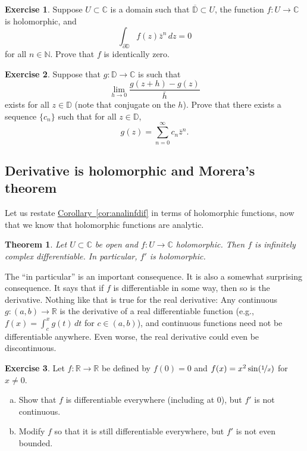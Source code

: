 \documentclass[12pt,openany]{book}
\newcommand{\C}{{\mathbb{C}}}
\newcommand{\R}{{\mathbb{R}}}
\newcommand{\N}{{\mathbb{N}}}
\newcommand{\D}{{\mathbb{D}}}
\newcommand{\myquote}[1]{``#1''}
\theoremstyle{plain}
\newtheorem{thm}{Theorem}[section]
\theoremstyle{remark}
\theoremstyle{definition}
\newenvironment{exbox}{%
    \def\FrameCommand{\vrule width 1pt \relax\hspace{10pt}}%
    \MakeFramed{\advance\hsize-\width\FrameRestore}%
}{%
    \endMakeFramed
}
\newenvironment{exparts}{%
    \leavevmode\begin{enumerate}[a),noitemsep,topsep=0pt,parsep=0pt,partopsep=0pt]
}{%
    \end{enumerate}
}
\theoremstyle{exercise}
\newtheorem{exercise}{Exercise}[section]
\theoremstyle{example}
\newcommand{\corref}[1]{\hyperref[#1]{Corollary~\ref*{#1}}}
\begin{document}
\begin{exbox}
\begin{exercise}
Suppose $U \subset \C$ is a domain such that $\overline{\D} \subset U$,
the function $f \colon U \to \C$ is holomorphic, and
\begin{equation*}
\int_{\partial \D} f(z) \bar{z}^n \, dz = 0
\end{equation*}
for all $n \in \N$.  Prove that $f$ is identically zero.
\end{exercise}

\begin{exercise}
Suppose that $g \colon \D \to \C$ is such that
\begin{equation*}
\lim_{h \to 0}
\frac{g(z+h)-g(z)}{\bar{h}}
\end{equation*}
exists for all $z \in \D$ (note that conjugate on the $h$).
Prove that there exists
a sequence $\{ c_n \}$ such that for all $z \in \D$,
\begin{equation*}
g(z) = \sum_{n=0}^\infty c_n \bar{z}^n .
\end{equation*}
\end{exercise}
\end{exbox}

\subsection{Derivative is holomorphic and Morera's theorem}

Let us restate \corref{cor:analinfdif} in terms of
holomorphic functions, now that we know that holomorphic functions are
analytic.

\begin{thm} \label{thm:holfuncinfder}
Let $U \subset \C$ be open and $f \colon U \to \C$ holomorphic.  Then
$f$ is infinitely complex differentiable.  In particular, $f'$ is
holomorphic.
\end{thm}

The \myquote{in particular} is an important consequence.  It is also a somewhat
surprising consequence.
It says that if $f$ is differentiable in some way,
then so is the derivative.  Nothing like that is true for the real
derivative:
Any continuous $g \colon (a,b) \to \R$ is the derivative
of a real differentiable function (e.g., $f(x) = \int_c^x g(t)\,dt$ for $c
\in (a,b)$),
and continuous functions need not be differentiable anywhere.
Even worse, the real derivative could even be discontinuous.

\begin{exbox}
\begin{exercise}
Let $f \colon \R \to \R$ be defined by $f(0) = 0$ and $f(x) = x^2
\sin( \nicefrac{1}{x} )$ for $x \not= 0$.
\begin{exparts}
\item
Show that $f$ is
differentiable everywhere (including at $0$), but $f'$ is not continuous.
\item
Modify $f$ so that it is still differentiable everywhere, but $f'$ is not
even bounded.
\end{exparts}
\end{exercise}
\end{exbox}
\end{document}
